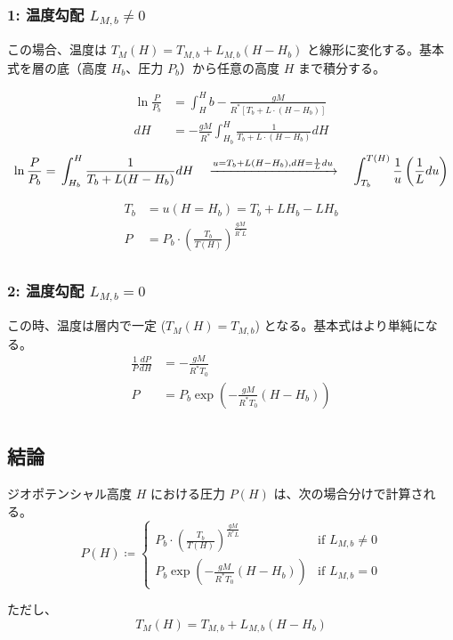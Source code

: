 \documentclass[a4paper,12pt]{article}
\begin{document}
\subsubsection*{1: 温度勾配 $L_{M,b} \neq 0$ }

この場合、温度は $T_M(H) = T_{M,b} + L_{M,b}(H - H_b)$ と線形に変化する。基本式を層の底（高度 $H_b$、圧力 $P_b$）から任意の高度 $H$ まで積分する。

\begin{align*}
\ln \frac{P}{P_b}&=\int^H_Hb- \frac{gM}{R^*\left[T_b+L \cdot \left(H-H_b \right) \right]}\\
dH&=- \frac{gM}{R^*} \int^H_{H_b}\frac{1}{T_b+L \cdot \left(H - H_b \right)}dH
\end{align*}
\[
\ln \frac{P}{P_b}=\\
\int_{H_b}^{H} \frac{1}{T_b + L(H - H_b)} dH \quad \xrightarrow{u=T_b+L(H-H_b), dH=\frac{1}{L}du} \quad \int_{T_b}^{T(H)} \frac{1}{u} \left(\frac{1}{L} du\right)
\]

\begin{align*}
T_b&=u(H=H_b)=T_b+LH_b-LH_b\\
P &= P_b \cdot \left( \frac{T_b}{T(H)} \right) ^ {\frac{gM}{R^*L}}\\
\end{align*}


\subsubsection*{2: 温度勾配 $L_{M,b} = 0$}
この時、温度は層内で一定 ($T_M(H) = T_{M,b}$) となる。基本式はより単純になる。
\begin{align*}
\frac{1}{P}\frac{dP}{dH}&=-\frac{gM}{R^*T_0}\\
P &= P_b \exp (-\frac{gM}{R^*T_0}(H-H_b))\\
\end{align*}
\subsection*{結論}
ジオポテンシャル高度 $H$ における圧力 $P(H)$ は、次の場合分けで計算される。
\[
P(H) \coloneq
\left\{
  \begin{array}{ll}
    P_b \cdot \left( \frac{T_b}{T(H)} \right) ^ {\frac{gM}{R^*L}} & \text{if } L_{M,b} \not = 0\\
    P_b \exp (-\frac{gM}{R^*T_0}(H-H_b)) & \text{if } L_{M,b} = 0 
  \end{array}
\right.
\]

ただし、
\[
T_M(H) = T_{M,b} + L_{M,b}(H - H_b)
\]
\end{document}
